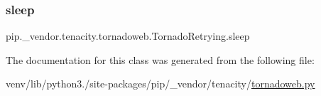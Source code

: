 \subsubsection{\texorpdfstring{sleep}{sleep}}
{\footnotesize\ttfamily pip.\+\_\+vendor.\+tenacity.\+tornadoweb.\+Tornado\+Retrying.\+sleep}



The documentation for this class was generated from the following file\+:\begin{DoxyCompactItemize}
\item 
venv/lib/python3./site-\/packages/pip/\+\_\+vendor/tenacity/\hyperlink{tornadoweb_8py}{tornadoweb.\+py}\end{DoxyCompactItemize}
